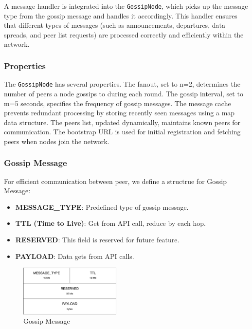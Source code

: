 A message handler is integrated into the \texttt{GossipNode}, which picks up the message type from the gossip message and handles it accordingly. This handler ensures that different types of messages (such as announcements, departures, data spreads, and peer list requests) are processed correctly and efficiently within the network.

\subsubsection{Properties}

The \texttt{GossipNode} has several properties. The fanout, set to n=2, determines the number of peers a node gossips to during each round. The gossip interval, set to m=5 seconds, specifies the frequency of gossip messages. The message cache prevents redundant processing by storing recently seen messages using a map data structure. The peers list, updated dynamically, maintains known peers for communication. The bootstrap URL is used for initial registration and fetching peers when nodes join the network.


\subsubsection{Gossip Message}

For efficient communication between peer, we define a structrue for Gossip Message:

\begin{itemize}
    \item \textbf{MESSAGE\_TYPE}:  Predefined type of gossip message.
    \item \textbf{TTL (Time to Live)}:  Get from API call, reduce by each hop.
    \item \textbf{RESERVED}: This field is reserved for future feature.
    \item \textbf{PAYLOAD}: Data gets from API calls.
\end{itemize}


\begin{figure}[H]
    \centering
    \includegraphics[width=0.45\textwidth]{pics/gossip.message.png}
    \caption{Gossip Message}
\end{figure}

